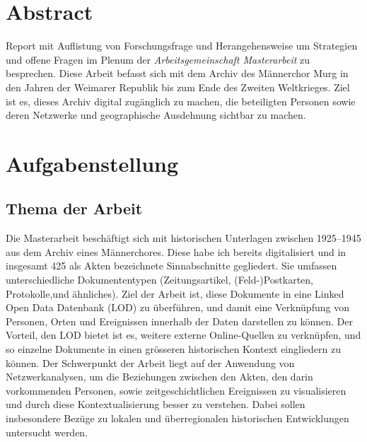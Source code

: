 \documentclass[12pt, a4paper, ngerman, bidi=default]{article}
\begin{document}
\vfill
\newpage
\pagecolor{white} %
\justifying%
\begin{spacing}{1.5}
\section*{Abstract}

Report mit Auflistung von Forschungsfrage und Herangehensweise um Strategien und offene Fragen im Plenum der \textit{Arbeitsgemeinschaft Masterarbeit} zu besprechen. Diese Arbeit befasst sich mit dem Archiv des Männerchor Murg in den Jahren der Weimarer Republik bis zum Ende des Zweiten Weltkrieges. Ziel ist es, dieses Archiv digital zugänglich zu machen, die beteiligten Personen sowie deren Netzwerke und geographische Ausdehnung sichtbar zu machen.
\section{Aufgabenstellung}
\subsection{\textbf{Thema der Arbeit}}

Die Masterarbeit beschäftigt sich mit historischen Unterlagen zwischen 1925--1945 aus dem Archiv eines Männerchores. Diese habe ich bereits digitalisiert und in insgesamt 425 als Akten bezeichnete Sinnabschnitte gegliedert. Sie umfassen unterschiedliche Dokumententypen (Zeitungsartikel, (Feld-)Postkarten, Protokolle,und ähnliches). Ziel der Arbeit ist, diese Dokumente in eine Linked Open Data Datenbank (LOD) zu überführen, und damit eine Verknüpfung von Personen, Orten und Ereignissen innerhalb der Daten darstellen zu können. Der Vorteil, den LOD bietet ist es, weitere externe Online-Quellen zu verknüpfen, und so einzelne Dokumente in einen grösseren historischen Kontext eingliedern zu können. 
Der Schwerpunkt der Arbeit liegt auf der Anwendung von Netzwerkanalysen, um die Beziehungen zwischen den Akten, den darin vorkommenden Personen, sowie zeitgeschichtlichen Ereignissen zu visualisieren und durch diese Kontextualisierung besser zu verstehen. Dabei sollen insbesondere Bezüge zu lokalen und überregionalen historischen Entwicklungen untersucht werden.


\end{spacing}
\end{document}
